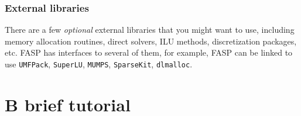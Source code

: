 \documentclass[11pt]{memoir}
\begin{document}

\subsection{External libraries}\label{ssec:lib}

There are a few \emph{optional} external libraries that you might want
to use, including memory allocation routines, direct solvers, ILU
methods, discretization packages, etc. FASP has interfaces to several
of them, for example, FASP can be linked to use \verb|UMFPack|, \verb|SuperLU|, \verb|MUMPS|,
\verb|SparseKit|, \verb|dlmalloc|.


\chapter{B brief tutorial}\label{ch:tutor}
\end{document}
